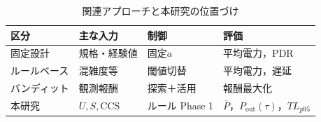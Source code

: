 \begin{table}[tb]
  \centering
  \caption{関連アプローチと本研究の位置づけ}
  \begin{tabular}{llll}
    \toprule
    区分 & 主な入力 & 制御 & 評価 \\
    \midrule
    固定設計 & 規格・経験値 & 固定$a$ & 平均電力，PDR \\
    ルールベース & 混雑度等 & 閾値切替 & 平均電力，遅延 \\
    バンディット & 観測報酬 & 探索＋活用 & 報酬最大化 \\
    本研究 & $U,S,\mathrm{CCS}$ & ルール Phase 1 & $\overline{P}$，$P_{\mathrm{out}}(\tau)$，$TL_{p95}$ \\
    \bottomrule
  \end{tabular}
\end{table}

